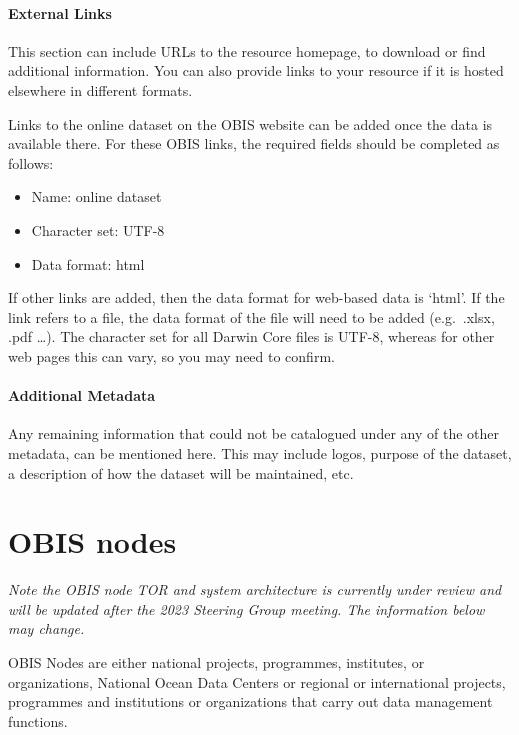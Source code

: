 \documentclass[
  letterpaper,
  DIV=11,
  numbers=noendperiod,
  oneside]{scrreprt}
\let\oldparagraph\paragraph
\renewcommand{\paragraph}[1]{\oldparagraph{#1}\mbox{}}
\providecommand{\tightlist}{%
  \setlength{\itemsep}{0pt}\setlength{\parskip}{0pt}}\usepackage{longtable,booktabs,array}
\begin{document}
\hypertarget{external-links}{%
\paragraph{External Links}\label{external-links}}

This section can include URLs to the resource homepage, to download or
find additional information. You can also provide links to your resource
if it is hosted elsewhere in different formats.

Links to the online dataset on the OBIS website can be added once the
data is available there. For these OBIS links, the required fields
should be completed as follows:

\begin{itemize}
\tightlist
\item
  Name: online dataset
\item
  Character set: UTF-8
\item
  Data format: html
\end{itemize}

If other links are added, then the data format for web-based data is
`html'. If the link refers to a file, the data format of the file will
need to be added (e.g.~.xlsx, .pdf \ldots). The character set for all
Darwin Core files is UTF-8, whereas for other web pages this can vary,
so you may need to confirm.

\hypertarget{additional-metadata}{%
\paragraph{Additional Metadata}\label{additional-metadata}}

Any remaining information that could not be catalogued under any of the
other metadata, can be mentioned here. This may include logos, purpose
of the dataset, a description of how the dataset will be maintained,
etc.

\hypertarget{obis-nodes}{%
\section{OBIS nodes}\label{obis-nodes}}

\emph{Note the OBIS node TOR and system architecture is currently under
review and will be updated after the 2023 Steering Group meeting. The
information below may change.}

OBIS Nodes are either national projects, programmes, institutes, or
organizations, National Ocean Data Centers or regional or international
projects, programmes and institutions or organizations that carry out
data management functions.
\end{document}
